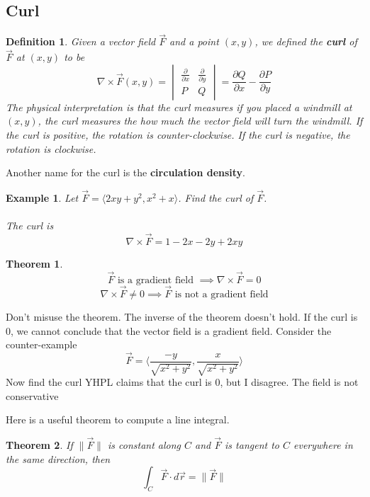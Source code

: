 \documentclass[11pt]{article}
\newtheorem{thm}{Theorem}
\newtheorem{defn}{Definition}
\newtheorem{ex}{Example}
\begin{document}
\subsection{Curl}
\begin{defn}
  Given a vector field $\vec{F}$ and a point $(x,y)$, we defined
  the \textbf{curl} of $\vec{F}$ at $(x,y)$ to be
  \[\nabla \times \vec{F} (x,y) = \begin{vmatrix}  \frac{\partial}{\partial x} & \frac{\partial}{\partial y} \\ P & Q \end{vmatrix}= \frac{\partial Q}{\partial x} - \frac{\partial P}{\partial y}\]
  The physical interpretation is that the curl measures if you
  placed a windmill at $(x,y)$, the curl measures the how much the
  vector field will turn the windmill. If the curl is positive,
  the rotation is counter-clockwise. If the curl is negative, the
  rotation is clockwise.
\end{defn}
Another name for the curl is the \textbf{circulation density}.
\begin{ex}
  Let $\vec{F} = \langle 2xy + y^2, x^2 + x \rangle$.
  Find the curl of $\vec{F}$.\\
  \\
  The curl is
  \[\nabla \times \vec{F} = 1 -2x-2y + 2xy\]
\end{ex}

\begin{thm}
  \[\vec{F} \text{ is a gradient field } \implies \nabla \times \vec{F} = 0\]
  \[\nabla \times \vec{F} \neq 0 \implies  \vec{F} \text{ is not a gradient field}\]
\end{thm}

Don't misuse the theorem. The inverse of the theorem doesn't hold.
If the curl is $0$, we cannot conclude that the vector field is a
gradient field.
Consider the counter-example
\[\vec{F} = \langle \frac{-y}{\sqrt{x^2+y^2}}, \frac{x}{\sqrt{x^2+ y^2}} \rangle\]
Now find the curl
YHPL claims that the curl is $0$, but I disagree. The field is
not conservative

Here is a useful theorem to compute a line integral.
\begin{thm}\label{thm:constant_vec_f}
  If $\|\vec{F}\|$ is constant along $C$ and $\vec{F}$ is
  tangent to $C$ everywhere in the same direction, then
  \[\int_C \vec{F} \cdot d \vec{r} = \|\vec{F} \|\]
\end{thm}
\end{document}
